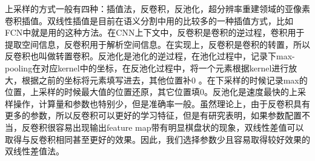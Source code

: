 \documentclass[UTF8]{ctexart}
\begin{document}



上采样的方式一般有四种：插值法，反卷积，反池化，超分辨率重建领域的亚像素卷积插值。双线性插值是目前在语义分割中用的比较多的一种插值方式，比如FCN中就是用的这种方法。在CNN上下文中，反卷积是卷积的逆过程，卷积用于提取空间信息，反卷积用于解析空间信息。在实现上，反卷积是卷积的转置，所以反卷积也叫做转置卷积。反池化是池化的逆过程，在池化过程中，记录下max-pooling在对应kernel中的坐标，在反池化过程中，将一个元素根据kernel进行放大，根据之前的坐标将元素填写进去，其他位置补0 。在下采样的时候记录max的位置，上采样的时候最大值的位置还原，其它位置填0。反池化是速度最快的上采样操作，计算量和参数也特别少，但是准确率一般。虽然理论上，由于反卷积具有更多的参数，所以反卷积可以更好的学习特征，但是有研究表明，如果参数配置不当，反卷积很容易出现输出feature map带有明显棋盘状的现象\cite{odena2016deconvolution}，双线性差值可以取得与反卷积相同甚至更好的效果。因此，我们选择参数少且容易取得较好效果的双线性差值法。
\end{document}
